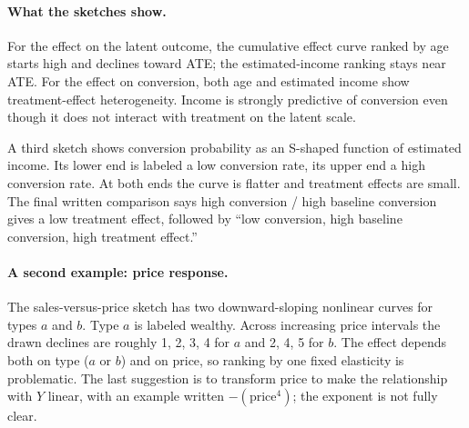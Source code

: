 \documentclass[11pt,a4paper]{article}
\begin{document}
{\paragraph{What the sketches show.}
For the effect on the latent outcome, the cumulative effect curve ranked by age starts high and declines toward ATE; the estimated-income ranking stays near ATE. For the effect on conversion, both age and estimated income show treatment-effect heterogeneity. Income is strongly predictive of conversion even though it does not interact with treatment on the latent scale.

A third sketch shows conversion probability as an S-shaped function of estimated income. Its lower end is labeled a low conversion rate, its upper end a high conversion rate. At both ends the curve is flatter and treatment effects are small. The final written comparison says high conversion / high baseline conversion gives a low treatment effect, followed by ``low conversion, high baseline conversion, high treatment effect.''

\paragraph{A second example: price response.}
The sales-versus-price sketch has two downward-sloping nonlinear curves for types $a$ and $b$. Type $a$ is labeled wealthy. Across increasing price intervals the drawn declines are roughly 1, 2, 3, 4 for $a$ and 2, 4, 5 for $b$. The effect depends both on type ($a$ or $b$) and on price, so ranking by one fixed elasticity is problematic. The last suggestion is to transform price to make the relationship with $Y$ linear, with an example written $-(\mathrm{price}^{4})$; the exponent is not fully clear.

\begin{center}
\begin{tikzpicture}[>=Stealth, font=\small, line width=.65pt]


\end{tikzpicture}
\end{center}}
\end{document}
